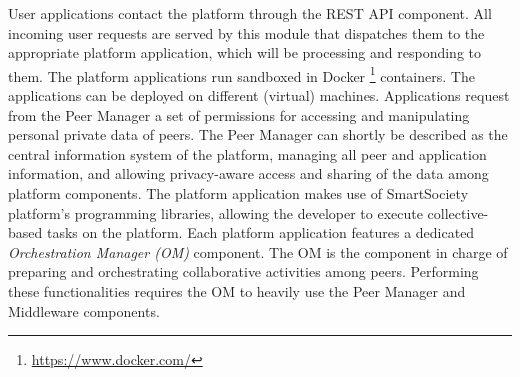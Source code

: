 User applications contact the platform through the REST API component.
All incoming user requests are served by this module that %
dispatches them to the appropriate platform application, which will be processing and responding to them. 
The platform applications run sandboxed in Docker \footnote{\url{https://www.docker.com/}} containers. The applications can be deployed on different (virtual) machines.
%
%
Applications request from the Peer Manager a set of permissions for accessing and manipulating personal private data of peers. The Peer Manager can shortly be described as the central information system of the platform, managing all peer and application information, and allowing privacy-aware access and sharing of the data among platform components. 
%
The platform application %
makes use of SmartSociety platform's programming libraries, allowing the developer to execute collective-based tasks on the platform. %
%
Each platform application features a dedicated \emph{Orchestration Manager (OM)} component. The OM is the component in charge of preparing and orchestrating collaborative activities among peers. Performing these functionalities requires the OM to heavily use the Peer Manager and \mdl{} Middleware components. 


